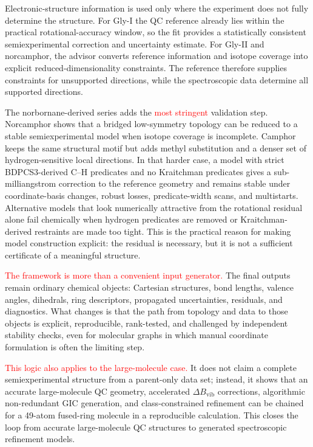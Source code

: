 \documentclass[aip,jcp,reprint,longbibliography,floatfix]{revtex4-2}
\newcommand{\rev}[1]{\textcolor{red}{#1}}
\begin{document}
Electronic-structure information is used only where the experiment does not
fully determine the structure. For Gly-I the QC reference already lies within
the practical rotational-accuracy window, so the fit provides a statistically
consistent semiexperimental correction and uncertainty estimate. For Gly-II
and norcamphor, the advisor converts reference information and isotope
coverage into explicit reduced-dimensionality constraints. The reference
therefore supplies constraints for unsupported directions, while the
spectroscopic data determine all supported directions.

The norbornane-derived series adds the \rev{most stringent} validation step. Norcamphor
shows that a bridged low-symmetry topology can be reduced to a stable
semiexperimental model when isotope coverage is incomplete. Camphor keeps the
same structural motif but adds methyl substitution and a denser set of
hydrogen-sensitive local directions. In that harder case, a model with strict
BDPCS3-derived C--H predicates and no Kraitchman predicates gives a
sub-milliangstrom correction to the reference geometry and remains stable
under coordinate-basis changes, robust losses, predicate-width scans, and
multistarts. Alternative models that look numerically attractive from the
rotational residual alone fail chemically when hydrogen predicates are removed
or Kraitchman-derived restraints are made too tight. This is the practical
reason for making model construction explicit: the residual is necessary, but
it is not a sufficient certificate of a meaningful structure.

\rev{The framework is more than a convenient input generator.} The final outputs remain
ordinary chemical objects: Cartesian structures, bond lengths, valence angles,
dihedrals, ring descriptors, propagated uncertainties, residuals, and
diagnostics. What changes is that the path from topology and data to those
objects is explicit, reproducible, rank-tested, and challenged by independent
stability checks, even for molecular graphs in which manual coordinate
formulation is often the limiting step.

\rev{This logic also applies to the large-molecule case.} It does not claim a complete
semiexperimental structure from a parent-only data set; instead, it shows that
an accurate large-molecule QC geometry, accelerated $\Delta B_\mathrm{vib}$
corrections, algorithmic non-redundant GIC generation, and class-constrained
refinement can be chained for a 49-atom fused-ring molecule in a
reproducible calculation. This closes the loop from accurate
large-molecule QC structures to generated spectroscopic
refinement models.
\end{document}
